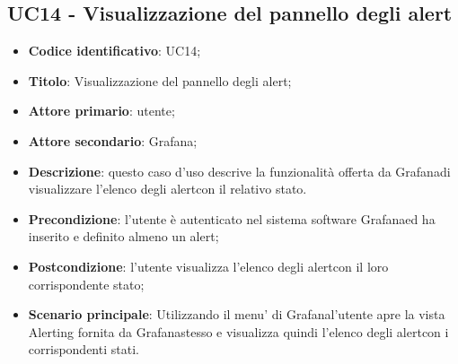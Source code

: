 \subsection{UC14 - Visualizzazione del pannello degli alert}
\begin{itemize}
	\item \textbf{Codice identificativo}: UC14;
	\item \textbf{Titolo}: Visualizzazione del pannello degli alert;
	\item \textbf{Attore primario}: utente;
	\item \textbf{Attore secondario}: Grafana\glo;
	\item \textbf{Descrizione}: questo caso d'uso descrive la funzionalità offerta da Grafana\glosp di visualizzare l'elenco degli alert\glosp con il relativo stato.
	\item \textbf{Precondizione}: l'utente è autenticato nel sistema software Grafana\glosp ed ha inserito e definito almeno un alert\glo;
	\item \textbf{Postcondizione}: l'utente visualizza l'elenco degli alert\glosp con il loro corrispondente stato;
	\item \textbf{Scenario principale}: Utilizzando il menu' di Grafana\glosp l'utente apre la vista Alerting fornita da Grafana\glosp stesso e visualizza quindi l'elenco degli alert\glosp con i corrispondenti stati.
\end{itemize} 
